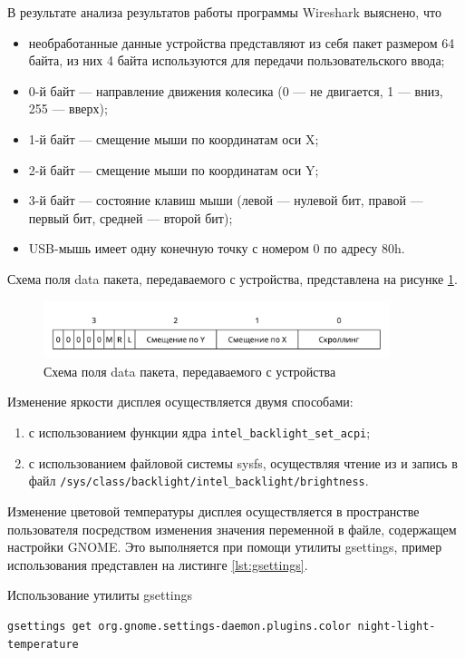 В результате анализа результатов работы программы Wireshark выяснено, что
\begin{itemize}
	\item необработанные данные устройства представляют из себя пакет размером 64 байта, из них 4 байта используются для передачи пользовательского ввода;
	\item 0-й байт --- направление движения колесика (0 --- не двигается, 1 --- вниз, 255 --- вверх);
	\item 1-й байт --- смещение мыши по координатам оси X;
	\item 2-й байт --- смещение мыши по координатам оси Y;
	\item 3-й байт --- состояние клавиш мыши (левой --- нулевой бит, правой --- первый бит, средней --- второй бит);
	\item USB-мышь имеет одну конечную точку с номером 0 по адресу 80h.
\end{itemize}

Схема поля data пакета, передаваемого с устройства, представлена на рисунке \ref{img:data}.

\begin{figure}[!htb]\centering
	\includegraphics[width=0.9\textwidth]{../img/data.pdf}
	\caption{Схема поля data пакета, передаваемого с устройства}
	\label{img:data}
\end{figure}

Изменение яркости дисплея осуществляется двумя способами:

\begin{enumerate}
	\item с использованием функции ядра \texttt{intel\_backlight\_set\_acpi};
	\item с использованием файловой системы sysfs, осуществляя чтение из и запись в файл \texttt{/sys/class/backlight/intel\_backlight/brightness}.
\end{enumerate}

Изменение цветовой температуры дисплея осуществляется в пространстве пользователя посредством изменения значения переменной в файле, содержащем настройки GNOME.
Это выполняется при помощи утилиты gsettings, пример использования представлен на листинге \ref{lst:gsettings}.

\begin{longlisting}
	\caption{Использование утилиты gsettings}
	\label{lst:gsettings}
	\begin{verbatim}
gsettings get org.gnome.settings-daemon.plugins.color night-light-temperature
	\end{verbatim}
\end{longlisting}

